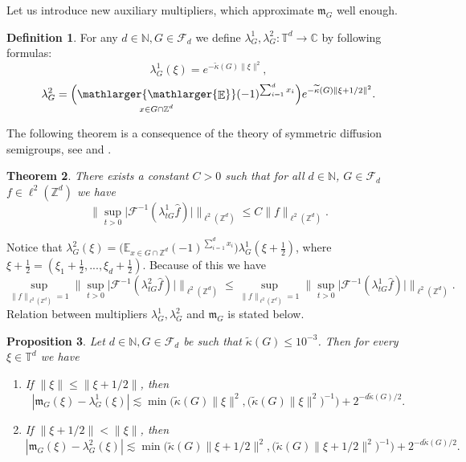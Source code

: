 \documentclass[a4paper,oneside, reqno]{amsart}
\numberwithin{equation}{section}
\newtheorem{Thm}{Theorem}[section]
\newtheorem{Prop}[Thm]{Proposition}
\theoremstyle{definition}%
\theoremstyle{definition}
\newtheorem{Defn}[Thm]{Definition}
\theoremstyle{definition}%
\theoremstyle{definition}
\newcommand{\E}{\mathop{\mathbb{E}}}
\newcommand{\Z}{\mathbb{Z}}
\newcommand{\N}{\mathbb{N}}
\newcommand{\T}{\mathbb{T}}
\newcommand{\se}[1]{\underset{_{\substack{#1}}}{\mathlarger{\mathlarger{\E}}}}
\begin{document}
Let us introduce new auxiliary multipliers, which approximate $\mathfrak{m}_G$ well enough. 




\begin{Defn}
    For any $d \in \N, G\in \mathcal{F}_d$ we define $\lambda_{G}^1,\lambda_{G}^2: \T^d \to \mathbb{C}$ by following formulas:
    \[
\lambda_{G}^1(\xi)=e^ {- \widetilde{\kappa}(G) \| \xi \|^2 },
\]
\[
\lambda_{G}^2= \Big(\se{x \in G \cap \Z^d} (-1)^{\sum_{i=1}^d x_i} \Big) e^ {- \widetilde{\kappa}(G)  \| \xi +1/2\|^2 }. 
\]
\end{Defn}
The following theorem is a consequence of the theory of symmetric diffusion semigroups, see  \cite[p. 73]{Ste1} and \cite[Theorem 2.11]{NW}.
\begin{Thm} \label{thm:4.2}
    There exists a constant $C>0$ such that for all $d \in \N$, $G \in \mathcal{F}_d$  $f \in \ell^2(\Z^d)$ we have
    \[ 
    \Big\| \sup_{t>0} \big|\mathcal{F}^{-1}(\lambda_{tG}^1 \widehat{f})\big|\Big\|_{\ell^2(\Z^d)} \leq C \|f \|_{\ell^2(\Z^d)}.
    \]
\end{Thm}
Notice that $\lambda_{G}^2(\xi)= \Big(\mathbb E_{x \in G \cap \Z^d} (-1)^{\sum_{i=1}^d x_i} \Big)\lambda_{G}^1(\xi+\frac{1}{2})$, where $\xi+\frac{1}{2}=(\xi_1 + \frac{1}{2},..., \xi_d+ \frac{1}{2})$. Because of this we have
\[
\sup_{\|f \|_{\ell^2(\Z ^d)}=1} \Big\| \sup_{t>0} \big|\mathcal{F}^{-1}(\lambda_{tG}^2 \widehat{f})\big|\Big \|_{\ell^2(\Z^d)} \le \sup_{\|f \|_{\ell^2(\Z ^d)}=1} \Big\| \sup_{t>0} \big|\mathcal{F}^{-1}(\lambda_{tG}^1 \widehat{f})\big|\Big \|_{\ell^2(\Z^d)}.
\]
Relation between multipliers $\lambda_{G}^1, \lambda_{G}^2$ and $\mathfrak{m}_{G}$ is stated below.
\begin{Prop} \label{prop:4.3}
Let $d \in \N, G \in \mathcal{F}_d$ be such that $\widetilde{\kappa}(G) \le 10^{-3}$. Then for every $\xi \in \T^d$ we have \\
\begin{enumerate}
    \item If $\|\xi \| \leq \|\xi+1/2 \|$, then
    \begin{equation*}
    |\mathfrak{m}_G(\xi)-\lambda_G^1(\xi)| \lesssim \min \bigg( \widetilde{\kappa}(G) \|\xi \|^2,  \Big(\widetilde{\kappa}(G)\|\xi \|^2 \Big)^{-1} \bigg)+ 2^{-d\widetilde{\kappa}(G)/2}.
    \end{equation*}

    \item If $\|\xi +1/2\| < \|\xi \|$, then
    \begin{equation*}
    |\mathfrak{m}_G(\xi)-\lambda_G^2(\xi)| \lesssim \min \bigg( \widetilde{\kappa}(G) \|\xi +1/2\|^2,  \Big(\widetilde{\kappa}(G)\|\xi +1/2\|^2 \Big)^{-1} \bigg)+ 2^{-d\widetilde{\kappa}(G)/2}.
    \end{equation*}
\end{enumerate}
\end{Prop}
\end{document}
